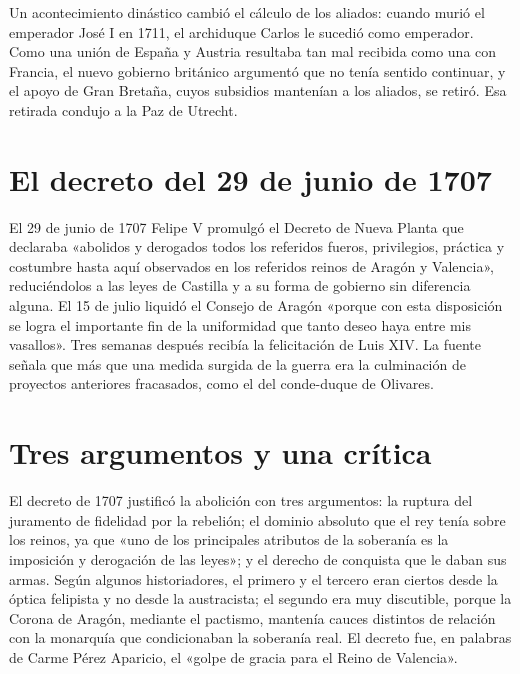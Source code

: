 \documentclass{book}
\begin{document}
Un acontecimiento dinástico cambió el cálculo de los aliados: cuando murió el emperador José I en 1711, el archiduque Carlos le sucedió como emperador. Como una unión de España y Austria resultaba tan mal recibida como una con Francia, el nuevo gobierno británico argumentó que no tenía sentido continuar, y el apoyo de Gran Bretaña, cuyos subsidios mantenían a los aliados, se retiró. Esa retirada condujo a la Paz de Utrecht.


\section{El decreto del 29 de junio de 1707}

El 29 de junio de 1707 Felipe V promulgó el Decreto de Nueva Planta que declaraba «abolidos y derogados todos los referidos fueros, privilegios, práctica y costumbre hasta aquí observados en los referidos reinos de Aragón y Valencia», reduciéndolos a las leyes de Castilla y a su forma de gobierno sin diferencia alguna. El 15 de julio liquidó el Consejo de Aragón «porque con esta disposición se logra el importante fin de la uniformidad que tanto deseo haya entre mis vasallos». Tres semanas después recibía la felicitación de Luis XIV. La fuente señala que más que una medida surgida de la guerra era la culminación de proyectos anteriores fracasados, como el del conde-duque de Olivares.


\section{Tres argumentos y una crítica}

El decreto de 1707 justificó la abolición con tres argumentos: la ruptura del juramento de fidelidad por la rebelión; el dominio absoluto que el rey tenía sobre los reinos, ya que «uno de los principales atributos de la soberanía es la imposición y derogación de las leyes»; y el derecho de conquista que le daban sus armas. Según algunos historiadores, el primero y el tercero eran ciertos desde la óptica felipista y no desde la austracista; el segundo era muy discutible, porque la Corona de Aragón, mediante el pactismo, mantenía cauces distintos de relación con la monarquía que condicionaban la soberanía real. El decreto fue, en palabras de Carme Pérez Aparicio, el «golpe de gracia para el Reino de Valencia».
\end{document}
